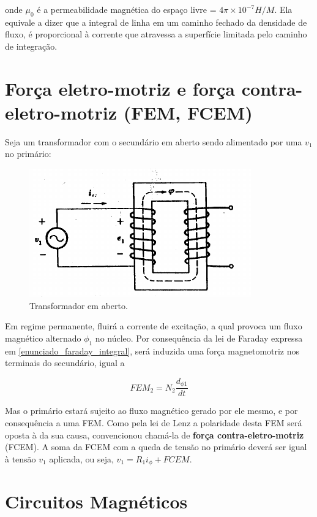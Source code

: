 \documentclass[]{report}
\begin{document}
onde $\mu_0$ é a permeabilidade magnética do espaço livre = $4 \pi \times 10^{-7} H/M$. Ela equivale a dizer que a integral de linha em um caminho fechado da densidade de fluxo, é proporcional à corrente que atravessa a superfície limitada pelo caminho de integração.

\chapter{Força eletro-motriz e força contra-eletro-motriz (FEM, FCEM)}

Seja um transformador com o secundário em aberto sendo alimentado por uma $v_1$ no primário:
\begin{center}
\label{trafo_aberto}
\begin{figure}[htb]

\centering
\includegraphics[scale=0.5]{trafo_2_em_aberto}
\caption{Transformador em aberto. \cite{fitzgerald}}
\end{figure}
\end{center}

Em regime permanente, fluirá a corrente de excitação, a qual provoca um fluxo magnético alternado $\phi_1$ no núcleo. Por consequência da lei de Faraday expressa em \ref{enunciado_faraday_integral}, será induzida uma força magnetomotriz nos terminais do secundário, igual a

\begin{equation}
{FEM}_2 = N_2 \frac{d_{\phi 1}}{dt}
\end{equation}

Mas o primário estará sujeito ao fluxo magnético gerado por ele mesmo, e por consequência a uma FEM. Como pela lei de Lenz a polaridade desta FEM será oposta à da sua causa, convencionou chamá-la de \textbf{força contra-eletro-motriz} (FCEM). A soma da FCEM com a queda de tensão no primário deverá ser igual à tensão $v_1$ aplicada, ou seja, $v_1 = R_1 i_\phi + FCEM$.

\chapter{Circuitos Magnéticos}
\end{document}
